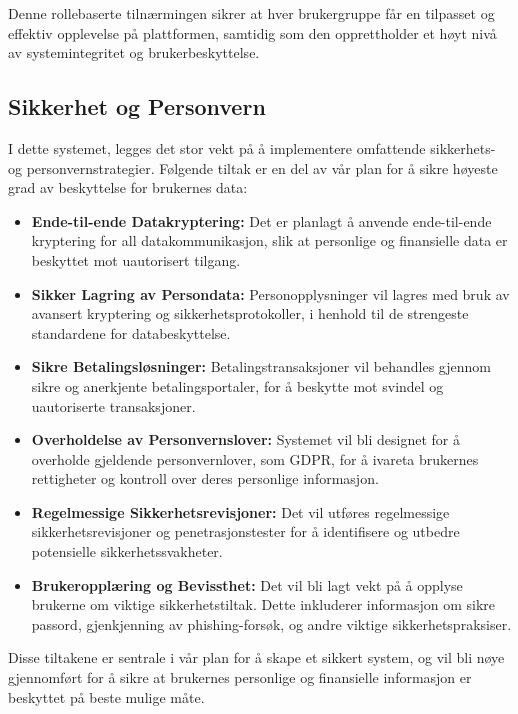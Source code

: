 \documentclass[../doc.tex]{subfiles}
\begin{document}
Denne rollebaserte tilnærmingen sikrer at hver brukergruppe får en tilpasset og effektiv opplevelse på plattformen, samtidig som den opprettholder et høyt nivå av systemintegritet og brukerbeskyttelse.

\subsection{Sikkerhet og Personvern}
I dette systemet, legges det stor vekt på å implementere omfattende sikkerhets- og personvernstrategier. Følgende tiltak er en del av vår plan for å sikre høyeste grad av beskyttelse for brukernes data:

\begin{itemize}
    \item \textbf{Ende-til-ende Datakryptering:} Det er planlagt å anvende ende-til-ende kryptering for all datakommunikasjon, slik at personlige og finansielle data er beskyttet mot uautorisert tilgang.

    \item \textbf{Sikker Lagring av Persondata:} Personopplysninger vil lagres med bruk av avansert kryptering og sikkerhetsprotokoller, i henhold til de strengeste standardene for databeskyttelse.

    \item \textbf{Sikre Betalingsløsninger:} Betalingstransaksjoner vil behandles gjennom sikre og anerkjente betalingsportaler, for å beskytte mot svindel og uautoriserte transaksjoner.

    \item \textbf{Overholdelse av Personvernslover:} Systemet vil bli designet for å overholde gjeldende personvernlover, som GDPR, for å ivareta brukernes rettigheter og kontroll over deres personlige informasjon.

    \item \textbf{Regelmessige Sikkerhetsrevisjoner:} Det vil utføres regelmessige sikkerhetsrevisjoner og penetrasjonstester for å identifisere og utbedre potensielle sikkerhetssvakheter.

    \item \textbf{Brukeropplæring og Bevissthet:} Det vil bli lagt vekt på å opplyse brukerne om viktige sikkerhetstiltak. Dette inkluderer informasjon om sikre passord, gjenkjenning av phishing-forsøk, og andre viktige sikkerhetspraksiser.
\end{itemize}

Disse tiltakene er sentrale i vår plan for å skape et sikkert system, og vil bli nøye gjennomført for å sikre at brukernes personlige og finansielle informasjon er beskyttet på beste mulige måte.
\end{document}
